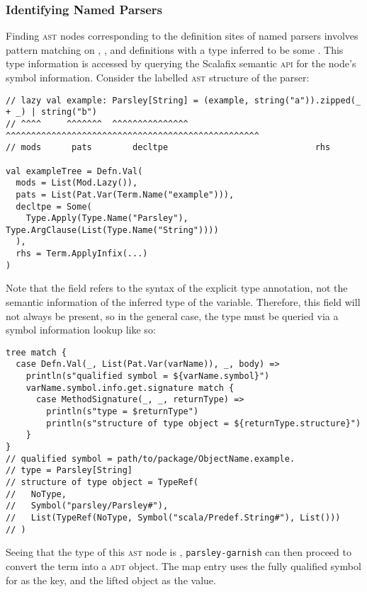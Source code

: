 \documentclass[../../main.tex]{subfiles}
\begin{document}
\subsubsection{Identifying Named Parsers}
Finding \textsc{ast} nodes corresponding to the definition sites of named parsers involves pattern matching on , , and  definitions with a type inferred to be some .
This type information is accessed by querying the Scalafix semantic \textsc{api} for the node's symbol information.
Consider the labelled \textsc{ast} structure of the  parser:
\begin{verbatim}
// lazy val example: Parsley[String] = (example, string("a")).zipped(_ + _) | string("b")
// ^^^^     ^^^^^^^  ^^^^^^^^^^^^^^^   ^^^^^^^^^^^^^^^^^^^^^^^^^^^^^^^^^^^^^^^^^^^^^^^^^^
// mods      pats        decltpe                             rhs

val exampleTree = Defn.Val(
  mods = List(Mod.Lazy()),
  pats = List(Pat.Var(Term.Name("example"))),
  decltpe = Some(
    Type.Apply(Type.Name("Parsley"), Type.ArgClause(List(Type.Name("String"))))
  ),
  rhs = Term.ApplyInfix(...)
)
\end{verbatim}
%
Note that the \scala{decltpe} field refers to the syntax of the explicit type annotation, not the semantic information of the inferred type of the variable.
Therefore, this field will not always be present, so in the general case, the type must be queried via a symbol information lookup like so:
\begin{verbatim}
tree match {
  case Defn.Val(_, List(Pat.Var(varName)), _, body) =>
    println(s"qualified symbol = ${varName.symbol}")
    varName.symbol.info.get.signature match {
      case MethodSignature(_, _, returnType) =>
        println(s"type = $returnType")
        println(s"structure of type object = ${returnType.structure}")
    }
}
// qualified symbol = path/to/package/ObjectName.example.
// type = Parsley[String]
// structure of type object = TypeRef(
//   NoType,
//   Symbol("parsley/Parsley#"),
//   List(TypeRef(NoType, Symbol("scala/Predef.String#"), List()))
// )
\end{verbatim}
Seeing that the type of this \textsc{ast} node is , \texttt{parsley-garnish} can then proceed to convert the  term into a  \textsc{adt} object.
The map entry uses the fully qualified symbol for \scala{example} as the key, and the lifted \scala{Parser} object as the value.
\end{document}
